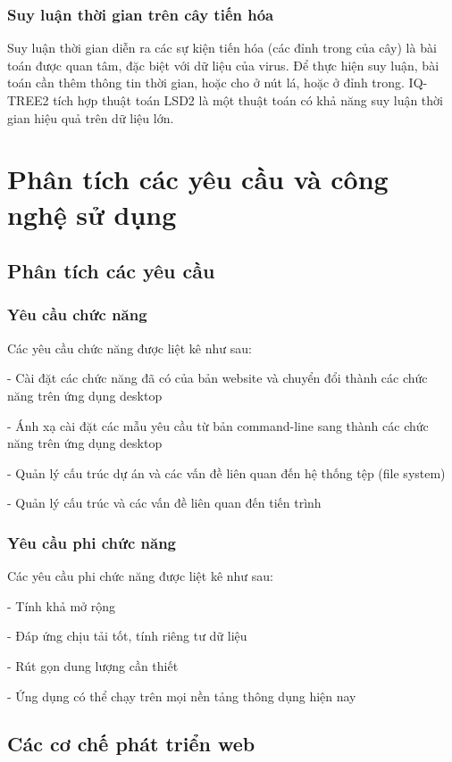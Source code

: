 \documentclass[12pt]{report}
\begin{document}
\subsection{Suy luận thời gian trên cây tiến hóa}
Suy luận thời gian diễn ra các sự kiện tiến hóa (các đỉnh trong của cây) là bài toán được quan tâm, đặc biệt với dữ liệu của virus. Để thực hiện suy luận, bài toán cần thêm thông tin thời gian, hoặc cho ở nút lá, hoặc ở đỉnh trong. IQ-TREE2 tích hợp thuật toán LSD2 \cite{cia-15} là một thuật toán có khả năng suy luận thời gian hiệu quả trên dữ liệu lớn.

\newpage	
\chapter{Phân tích các yêu cầu và công nghệ sử dụng}
\label{chap:chapter3}

\section{Phân tích các yêu cầu}
\subsection{Yêu cầu chức năng}
Các yêu cầu chức năng được liệt kê như sau:

- Cài đặt các chức năng đã có của bản website và chuyển đổi thành các chức năng trên ứng dụng desktop

- Ánh xạ cài đặt các mẫu yêu cầu từ bản command-line sang thành các chức năng trên ứng dụng desktop

- Quản lý cấu trúc dự án và các vấn đề liên quan đến hệ thống tệp (file system)

- Quản lý cấu trúc và các vấn đề liên quan đến tiến trình
\subsection{Yêu cầu phi chức năng}
Các yêu cầu phi chức năng được liệt kê như sau:

- Tính khả mở rộng

- Đáp ứng chịu tải tốt, tính riêng tư dữ liệu

- Rút gọn dung lượng cần thiết

- Ứng dụng có thể chạy trên mọi nền tảng thông dụng hiện nay

\section{Các cơ chế phát triển web}
\end{document}
